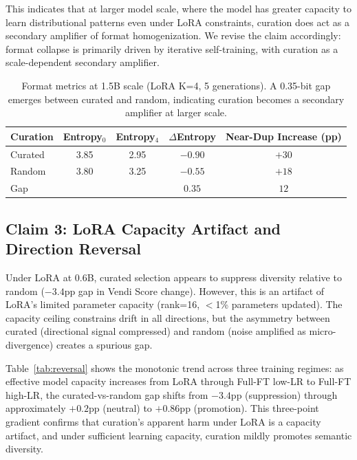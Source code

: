 \documentclass[11pt,a4paper]{article}
\begin{document}
This indicates that at larger model scale, where the model has greater capacity to learn distributional patterns even under LoRA constraints, curation does act as a secondary amplifier of format homogenization. We revise the claim accordingly: format collapse is primarily driven by iterative self-training, with curation as a scale-dependent secondary amplifier.

\begin{table}[t]
\centering
\caption{Format metrics at 1.5B scale (LoRA K=4, 5 generations). A 0.35-bit gap emerges between curated and random, indicating curation becomes a secondary amplifier at larger scale.}
\label{tab:format_15b}
\small
\begin{tabular}{@{}lcccc@{}}
\toprule
Curation & Entropy$_0$ & Entropy$_4$ & $\Delta$Entropy & Near-Dup Increase (pp) \\
\midrule
Curated & 3.85 & 2.95 & $-0.90$ & $+30$ \\
Random  & 3.80 & 3.25 & $-0.55$ & $+18$ \\
\midrule
Gap & & & $0.35$ & $12$ \\
\bottomrule
\end{tabular}
\end{table}

\subsection{Claim 3: LoRA Capacity Artifact and Direction Reversal}

Under LoRA at 0.6B, curated selection appears to suppress diversity relative to random ($-3.4$pp gap in Vendi Score change). However, this is an artifact of LoRA's limited parameter capacity (rank=16, $<$1\% parameters updated). The capacity ceiling constrains drift in all directions, but the asymmetry between curated (directional signal compressed) and random (noise amplified as micro-divergence) creates a spurious gap.

Table~\ref{tab:reversal} shows the monotonic trend across three training regimes: as effective model capacity increases from LoRA through Full-FT low-LR to Full-FT high-LR, the curated-vs-random gap shifts from $-3.4$pp (suppression) through approximately $+0.2$pp (neutral) to $+0.86$pp (promotion). This three-point gradient confirms that curation's apparent harm under LoRA is a capacity artifact, and under sufficient learning capacity, curation mildly promotes semantic diversity.
\end{document}
